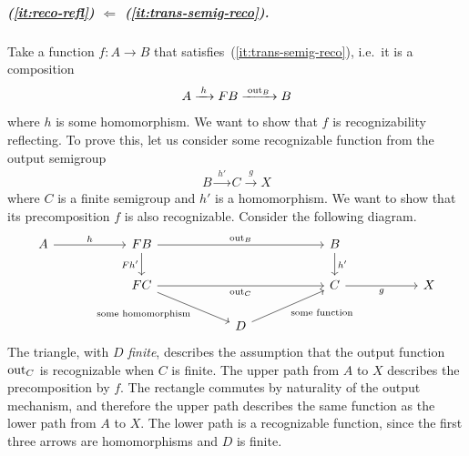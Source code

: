     
\subparagraph{
     (\ref{it:reco-refl}) $\Leftarrow$ (\ref{it:trans-semig-reco}).} Take a function $f\colon A \to B$ that satisfies~(\ref{it:trans-semig-reco}), i.e.~it is a composition 
\begin{align*}
    A \xrightarrow{\;h\;} \functor B \xrightarrow{\;\outfun_B\;} B
\end{align*}
where $h$ is some homomorphism.
We want to show that $f$ is recognizability reflecting. To prove this, let us
consider some recognizable function from the output semigroup 
\begin{align*}
    B \xrightarrow{\;h'\;} C \xrightarrow{\;g\;} X
\end{align*}
where $C$ is a finite semigroup and $h'$ is a homomorphism.
We want to show that its precomposition $f$ is also recognizable. Consider the following diagram. 
\[\begin{tikzcd}
    [column sep=2cm]
	A & {\functor B} & & B \\
	& {\functor C} & & C & X\\
    & & D
	\arrow["h", from=1-1, to=1-2]
	\arrow["\outfun_B", from=1-2, to=1-4]
	\arrow["{\functor h'}"', from=1-2, to=2-2]
	\arrow["\outfun_C"', from=2-2, to=2-4]
	\arrow["h'", from=1-4, to=2-4]
	\arrow["g"', from=2-4, to=2-5]
    \arrow["\text{some homomorphism}"', from=2-2, to=3-3]
    \arrow["\text{some function}"', from=3-3, to=2-4]
\end{tikzcd}\]
The triangle, with $D$ \emph{finite}, describes  the assumption that the output function $\mathrm{out}_C$ is recognizable when $C$ is finite.
The upper path from $A$ to $X$ describes the precomposition by $f$. 
 The  rectangle commutes by naturality of the output mechanism, and therefore the upper path describes the same function as the lower path from $A$ to $X$. The lower path is a recognizable function, since the first three arrows are homomorphisms and $D$ is finite.
